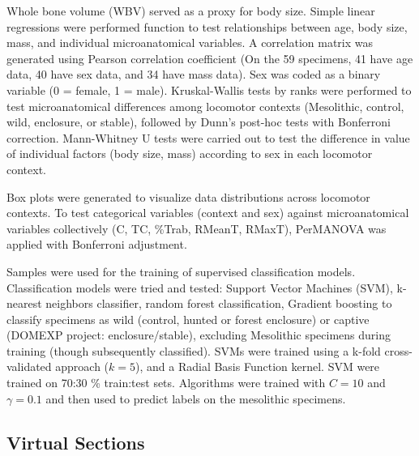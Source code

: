 \documentclass[12pt,a4paper]{article}
\begin{document}
Whole bone volume (WBV) served as a proxy for body size. Simple linear regressions were performed function to test relationships between age, body size, mass, and individual microanatomical variables. A correlation matrix was generated using Pearson correlation coefficient (On the 59 specimens, 41 have age data, 40 have sex data, and 34 have mass data). Sex was coded as a binary variable (0 = female, 1 = male).
Kruskal-Wallis tests by ranks were performed to test microanatomical differences among locomotor contexts (Mesolithic, control, wild, enclosure, or stable), followed by Dunn's post-hoc tests with Bonferroni correction. Mann-Whitney U tests were carried out to test the difference in value of individual factors (body size, mass) according to sex in each locomotor context.

Box plots were generated to visualize data distributions across locomotor contexts. To test categorical variables (context and sex) against microanatomical variables collectively (C, TC, \%Trab, RMeanT, RMaxT), PerMANOVA was applied with Bonferroni adjustment. %

Samples were used for the training of supervised classification models. Classification models were tried and tested: Support Vector Machines (SVM), k-nearest neighbors classifier, random forest classification, Gradient boosting to classify specimens as wild (control, hunted or forest enclosure) or captive (DOMEXP project: enclosure/stable), excluding Mesolithic specimens during training (though subsequently classified).
SVMs were trained using a k-fold cross-validated approach ($k = 5$), and a Radial Basis Function kernel. SVM were trained on 70:30 \% train:test sets. Algorithms were trained with $C = 10$ and $\gamma = 0.1$ and then used to predict labels on the mesolithic specimens.

\subsection{Virtual Sections}
\end{document}
